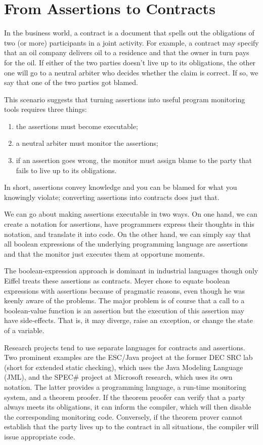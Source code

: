 \documentclass[11pt]{article}
\begin{document}
\section{From Assertions to Contracts}

In the business world, a contract is a document that spells out the
obligations of two (or more) participants in a joint activity. For example, a
contract may specify that an oil company delivers oil to a residence and that
the owner in turn pays for the oil. If either of the two parties doesn't live up
to its obligations, the other one will go to a neutral arbiter who decides
whether the claim is correct. If so, we say that one of the two parties got
blamed. 


This scenario suggests that turning assertions into useful program monitoring
tools requires three things: 
\begin{enumerate}
\item the assertions must become executable;
\item a neutral arbiter must monitor the assertions;
\item if an assertion goes wrong, the monitor must assign blame to the party that
fails to live up to its obligations.
\end{enumerate}

In short, assertions convey knowledge and you can be blamed for what you
knowingly violate; converting assertions into contracts does just that. 


We can go about making assertions executable in two ways. On one hand, we can
create a notation for assertions, have programmers express their thoughts in
this notation, and translate it into code. On the other hand, we can simply say
that all boolean expressions of the underlying programming language are
assertions and that the monitor just executes them at opportune moments.

The boolean-expression approach is dominant in industrial languages though
only Eiffel treats these assertions as contracts. Meyer chose to equate boolean
expressions with assertions because of pragmatic reasons, even though he was
keenly aware of the problems. The major problem is of course that a call to a
boolean-value function is an assertion but the execution of this assertion may
have side-effects. That is, it may diverge, raise an exception, or change the
state of a variable. 

Research projects tend to use separate languages for contracts and
assertions. Two prominent examples are the ESC/Java project at the former DEC
SRC lab (short for extended static checking), which uses the Java Modeling
Language (JML), and the SPEC\# project at Microsoft research, which uses its own
notation. The latter provides a programming language, a run-time monitoring
system, and a theorem proofer. If the theorem proofer can verify that a party
always meets its obligations, it can inform the compiler, which will then
disable the corresponding monitoring code. Conversely, if the theorem prover
cannot establish that the party lives up to the contract in all situations, the
compiler will issue appropriate code. 
\end{document}
